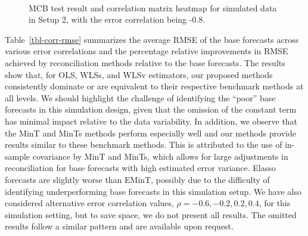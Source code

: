 \documentclass[
  11pt]{article}
\theoremstyle{plain}
\theoremstyle{remark}
\begin{document}
\begin{table}
{}

\end{table}%

\begin{figure}

\begin{minipage}{0.48\linewidth}



\end{minipage}%
%
\begin{minipage}{0.04\linewidth}
~\end{minipage}%
%
\begin{minipage}{0.48\linewidth}



\end{minipage}%

\caption{\label{fig-corr-plots}MCB test result and correlation matrix
heatmap for simulated data in Setup 2, with the error correlation being
-0.8.}

\end{figure}%

Table~\ref{tbl-corr-rmse} summarizes the average RMSE of the base
forecasts across various error correlations and the percentage relative
improvements in RMSE achieved by reconciliation methods relative to the
base forecasts. The results show that, for OLS, WLSs, and WLSv
estimators, our proposed methods consistently dominate or are equivalent
to their respective benchmark methods at all levels. We should highlight
the challenge of identifying the ``poor'' base forecasts in this
simulation design, given that the omission of the constant term has
minimal impact relative to the data variability. In addition, we observe
that the MinT and MinTs methods perform especially well and our methods
provide results similar to these benchmark methods. This is attributed
to the use of in-sample covariance by MinT and MinTs, which allows for
large adjustments in reconciliation for base forecasts with high
estimated error variance. Elasso forecasts are slightly worse than
EMinT, possibly due to the difficulty of identifying underperforming
base forecasts in this simulation setup. We have also considered
alternative error correlation values, \(\rho = -0.6, -0.2, 0.2, 0.4\),
for this simulation setting, but to save space, we do not present all
results. The omitted results follow a similar pattern and are available
upon request.
\end{document}
